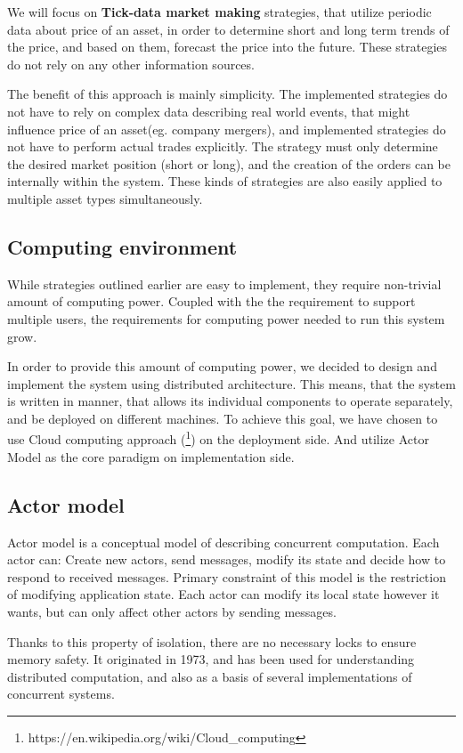 \documentclass{ExcelAtFIT}
\begin{document}
    We will focus on \textbf{Tick-data market making} strategies, that utilize periodic data about price of an asset, in order to determine short and long term trends of the price, and
    based on them, forecast the price into the future. These strategies do not rely on any other information sources.

    The benefit of this approach is mainly simplicity. The implemented strategies do not have to rely on complex data describing real world events, that might influence price
    of an asset(eg. company mergers), and implemented strategies do not have to perform actual trades explicitly. The strategy must only
    determine the desired market position (short or long), and the creation of the orders can be internally within the system.
    These kinds of strategies are also easily applied to multiple asset types simultaneously.

    \subsection{Computing environment}
    While strategies outlined earlier are easy to implement, they require non-trivial amount of computing power.
    Coupled with the the requirement to support multiple users, the requirements for computing power needed to
    run this system grow.

    In order to provide this amount of computing power, we decided to design and implement the system using distributed architecture.
    This means, that the system is written in manner, that allows its individual components to operate separately, and be deployed on different machines.
    To achieve this goal, we have chosen to use Cloud computing approach (\footnote{https://en.wikipedia.org/wiki/Cloud\_computing}) on the deployment side.
    And utilize Actor Model as the core paradigm on implementation side.

    \subsection{Actor model}
    Actor model is a conceptual model of describing concurrent computation. Each actor can: Create new actors, send messages, modify its state and decide how to respond to
    received messages. Primary constraint of this model is the restriction of modifying application state.
    Each actor can modify its local state however it wants, but can only affect other actors by sending messages.

    Thanks to this property of isolation, there are no necessary locks to ensure memory safety.
    It originated in 1973, and has been used for understanding distributed computation, and also as
    a basis of several implementations of concurrent systems.
\end{document}
